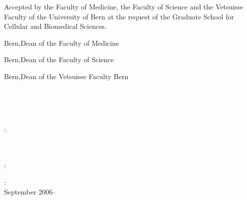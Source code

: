 \thispagestyle{empty}
\noindent Accepted by the Faculty of Medicine, the Faculty of Science and the Vetsuisse Faculty of the University of Bern at the request of the Graduate School for Cellular and Biomedical Sciences.

\vspace{2.5cm}
\noindent Bern,\hfill Dean of the Faculty of Medicine

\vspace{2.5cm}
\noindent Bern,\hfill Dean of the Faculty of Science

\vspace{2.5cm}
\noindent Bern,\hfill Dean of the Vetsuisse Faculty Bern\\

\vfill

\noindent\myName\\\emph{\myTitle}\\\myDegree\\\myVersion

\bigskip
\noindent{}:\\
\myProf \\
\myOtherProf \\ 
\mySupervisor

\medskip

\noindent{}:\\
\noindent\myLocation

\medskip
\noindent{}:\\
September 2006--\myTime